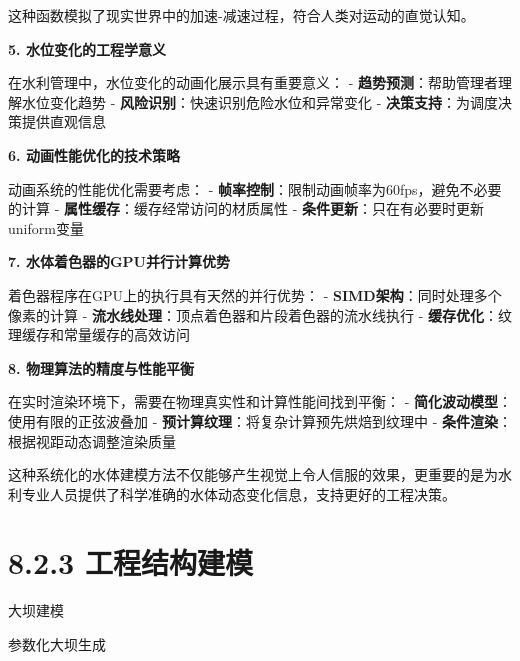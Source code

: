 这种函数模拟了现实世界中的加速-减速过程，符合人类对运动的直觉认知。

\textbf{5. 水位变化的工程学意义}

在水利管理中，水位变化的动画化展示具有重要意义： - \textbf{趋势预测}：帮助管理者理解水位变化趋势 - \textbf{风险识别}：快速识别危险水位和异常变化 - \textbf{决策支持}：为调度决策提供直观信息

\textbf{6. 动画性能优化的技术策略}

动画系统的性能优化需要考虑： - \textbf{帧率控制}：限制动画帧率为60fps，避免不必要的计算 - \textbf{属性缓存}：缓存经常访问的材质属性 - \textbf{条件更新}：只在有必要时更新uniform变量

\textbf{7. 水体着色器的GPU并行计算优势}

着色器程序在GPU上的执行具有天然的并行优势： - \textbf{SIMD架构}：同时处理多个像素的计算 - \textbf{流水线处理}：顶点着色器和片段着色器的流水线执行 - \textbf{缓存优化}：纹理缓存和常量缓存的高效访问

\textbf{8. 物理算法的精度与性能平衡}

在实时渲染环境下，需要在物理真实性和计算性能间找到平衡： - \textbf{简化波动模型}：使用有限的正弦波叠加 - \textbf{预计算纹理}：将复杂计算预先烘焙到纹理中 - \textbf{条件渲染}：根据视距动态调整渲染质量

这种系统化的水体建模方法不仅能够产生视觉上令人信服的效果，更重要的是为水利专业人员提供了科学准确的水体动态变化信息，支持更好的工程决策。

\section{8.2.3 工程结构建模}

 大坝建模

 参数化大坝生成

